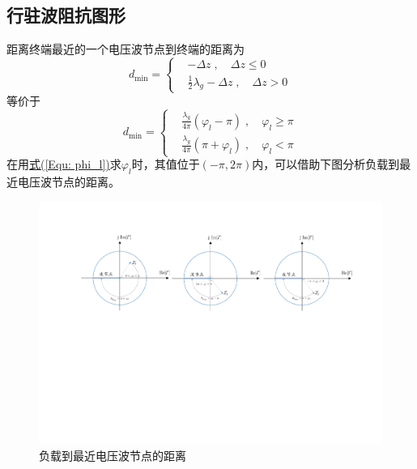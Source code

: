 \subsection{行驻波阻抗图形}
    距离终端最近的一个电压波节点到终端的距离为
    \begin{equation}
        d_\mathrm{min}=
        \left\{\begin{aligned}
            &-\Delta z \;,\quad \Delta z\leqslant0\\
            &\frac{1}{2}\lambda_g-\Delta z\;,\quad \Delta z>0
        \end{aligned}\right.
    \end{equation}
    等价于
    \begin{equation*}
        d_\mathrm{min}=
        \left\{\begin{aligned}
            &\frac{\lambda_g}{4\pi}\left(\varphi_l-\pi\right) \;,\quad \varphi_l\geqslant \pi\\
            &\frac{\lambda_g}{4\pi}\left(\pi+\varphi_l\right) \;,\quad \varphi_l < \pi
        \end{aligned}\right.
    \end{equation*}
    在用\hyperref[Equ: phi_l]{式(\ref*{Equ: phi_l})}求$\varphi_l$时，其值位于$(-\pi,2 \pi)$内，可以借助下图分析负载到最近电压波节点的距离。

    \begin{figure}[htp]
        \centering
        \includegraphics[width=15cm]{figure/1-2.pdf}
        \caption{\kaishu 负载到最近电压波节点的距离}\label{Fig: 负载到最近电压波节点的距离}
    \end{figure}


